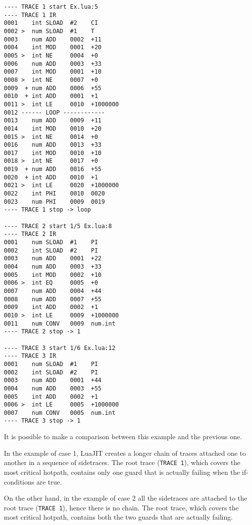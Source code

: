\begin{multicols}{2}
\begin{lstlisting}[style=DumpStyle]
---- TRACE 1 start Ex.lua:5
---- TRACE 1 IR
0001    int SLOAD  #2    CI
0002 >  num SLOAD  #1    T
0003    num ADD    0002  +11 
0004    int MOD    0001  +20 
0005 >  int NE     0004  +0  
0006    num ADD    0003  +33 
0007    int MOD    0001  +10 
0008 >  int NE     0007  +0  
0009  + num ADD    0006  +55 
0010  + int ADD    0001  +1  
0011 >  int LE     0010  +1000000
0012 ------ LOOP ------------
0013    num ADD    0009  +11 
0014    int MOD    0010  +20 
0015 >  int NE     0014  +0  
0016    num ADD    0013  +33 
0017    int MOD    0010  +10 
0018 >  int NE     0017  +0  
0019  + num ADD    0016  +55 
0020  + int ADD    0010  +1  
0021 >  int LE     0020  +1000000
0022    int PHI    0010  0020
0023    num PHI    0009  0019
---- TRACE 1 stop -> loop

---- TRACE 2 start 1/5 Ex.lua:8
---- TRACE 2 IR
0001    num SLOAD  #1    PI
0002    int SLOAD  #2    PI
0003    num ADD    0001  +22 
0004    num ADD    0003  +33 
0005    int MOD    0002  +10 
0006 >  int EQ     0005  +0  
0007    num ADD    0004  +44 
0008    num ADD    0007  +55 
0009    int ADD    0002  +1  
0010 >  int LE     0009  +1000000
0011    num CONV   0009  num.int
---- TRACE 2 stop -> 1

---- TRACE 3 start 1/6 Ex.lua:12
---- TRACE 3 IR
0001    num SLOAD  #1    PI
0002    int SLOAD  #2    PI
0003    num ADD    0001  +44 
0004    num ADD    0003  +55 
0005    int ADD    0002  +1  
0006 >  int LE     0005  +1000000
0007    num CONV   0005  num.int
---- TRACE 3 stop -> 1
\end{lstlisting}
\end{multicols}

\noindent
It is possible to make a comparison between this example and the previous one. 

In the example of case 1, LuaJIT creates a longer chain of traces attached one to another in a sequence of sidetraces. The root trace (\texttt{TRACE 1}), which covers the most critical hotpath, contains only one guard that is actually failing when the if-conditions are true. 

On the other hand, in the example of case 2 all the sidetraces are attached to the root trace (\texttt{TRACE 1}), hence there is no chain. The root trace, which covers the most critical hotpath, contains both the two guards that are actually failing.

